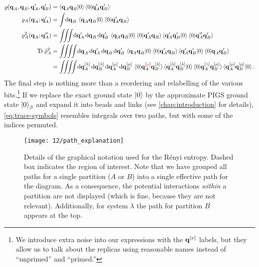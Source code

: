 \begin{subequations} \label{eq:trace}
\begin{align}
	\rho(\vec{q}_A, \vec{q}_B ; \vec{q}_A', \vec{q}_B')
	&= \braket{\vec{q}_A \vec{q}_B | 0} \braket{0 | \vec{q}_A' \vec{q}_B'} \\
	\rho_A(\vec{q}_A; \vec{q}_A')
	&= \int\! \dif \vec{q}_B \, \braket{\vec{q}_A \vec{q}_B | 0} \braket{0 | \vec{q}_A' \vec{q}_B} \\
	\rho_A^2(\vec{q}_A; \vec{q}_A'')
	&= \iiint\! \dif \vec{q}_A' \dif \vec{q}_B \dif \vec{q}_B' \,
			\braket{\vec{q}_A \vec{q}_B | 0} \braket{0 | \vec{q}_A' \vec{q}_B}
			\braket{\vec{q}_A' \vec{q}_B' | 0} \braket{0 | \vec{q}_A'' \vec{q}_B'} \\
	\Tr{\hat{\rho}_A^2}
	&= \iiiint\! \dif \vec{q}_A \dif \vec{q}_A' \dif \vec{q}_B \dif \vec{q}_B' \,
			\braket{\vec{q}_A \vec{q}_B | 0} \braket{0 | \vec{q}_A' \vec{q}_B}
			\braket{\vec{q}_A' \vec{q}_B' | 0} \braket{0 | \vec{q}_A \vec{q}_B'} \\
	&= \iiiint\! \dif \vec{q}_A\sys{\lambda} \dif \vec{q}_B\sys{\lambda} \dif \vec{q}_A\sys{\mu} \dif \vec{q}_B\sys{\mu} \,
			\braket{0 | \vec{q}_A\sys{\red{\mu}} \vec{q}_B\sys{\lambda}} \braket{\vec{q}_A\sys{\lambda} \vec{q}_B\sys{\lambda} | 0}
			\braket{0 | \vec{q}_A\sys{\red{\lambda}} \vec{q}_B\sys{\mu}} \braket{\vec{q}_A\sys{\mu} \vec{q}_B\sys{\mu} | 0}.
				\label{eq:trace-symbols}
\end{align}
\end{subequations}
The final step is nothing more than a reordering and relabelling of the various bits.\footnote{
	We introduce extra noise into our expressions with the $\bm{\mathbf{q}}^{[x]}$ labels, but they allow us to talk about the replicas using reasonable names instead of ``unprimed'' and ``primed.''
}
If we replace the exact ground state $\ket{0}$ by the approximate PIGS ground state $\ket{0}_\beta$ and expand it into beads and links (see \cref{chap:introduction} for details), \cref{eq:trace-symbols} resembles integrals over two paths, but with some of the indices permuted.

\begin{figure}
	\centering
	\texttt{[image: 12/path\_explanation]}
	\caption[
		Graphical notation for Rényi entropy
	]{
		Details of the graphical notation used for the Rényi entropy.
		Dashed box indicates the region of interest.
		Note that we have grouped all paths for a single partition ($A$ or $B$) into a single effective path for the diagram.
		As a consequence, the potential interactions \emph{within} a partition are not displayed (which is fine, because they are not relevant).
		Additionally, for system $\lambda$ the path for partition $B$ appears at the top.
	}
	\label{fig:renyi-path-explanation}
\end{figure}

